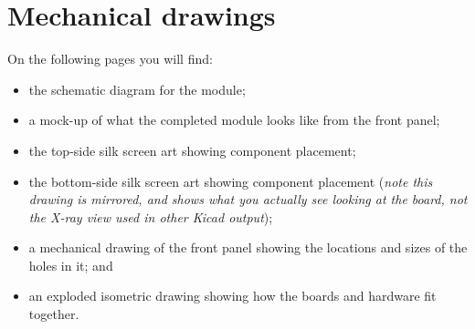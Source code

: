 
%
%
%
%
%
%

\chapter{Mechanical drawings}

On the following pages you will find:
\begin{itemize}
  \item the schematic diagram for the module;
  \item a mock-up of what the completed module looks like from the front
    panel;
  \item the top-side silk screen art showing component placement;
  \item the bottom-side silk screen art showing component placement
    (\emph{note this drawing is mirrored, and shows what you actually see
    looking at the board, not the X-ray view used in other Kicad output});
  \item a mechanical drawing of the front panel showing the locations and
    sizes of the holes in it; and
  \item an exploded isometric drawing showing how the boards and hardware
    fit together.
\end{itemize}

\texdependspdfworkaround

\clearpage\label{fig:schematic}


\thispagestyle{empty}
\onecolumn
\vspace*{\fill}\begin{center}
\setlength{\fboxsep}{0pt}%
\setlength{\fboxrule}{1pt}%
\end{center}
\vspace*{\fill}

\clearpage



\clearpage\label{fig:exploded}

